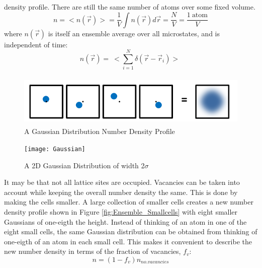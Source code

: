 \documentclass[double,12pt]{beavtex}
\begin{document}
density profile. There are still the same number of atoms over some fixed volume. 
\begin{equation}{n=<n(\vec{r})>=\frac{1}{V}\int{n(\vec{r})}{d\vec{r}}=\frac{N}{V}=\frac{1~\text{atom}}{V}}\end{equation}
where $n(\vec r)$ is itself an ensemble average over all microstates, and is independent of time:
\begin{equation}n(\vec r)=~<\sum_{i=1}^N\delta(\vec r - \vec r_i)>~\end{equation}

  \begin{figure}[h!]
    \centering
    \includegraphics[height=2.5cm]{Ensemble_Gaussian.png}
    \caption{A Gaussian Distribution Number Density Profile}
    \label{fig:Ensemble_Gaus}
  \end{figure} 

 \begin{figure}[h!]
    \centering
    \texttt{[image: Gaussian]}
    \caption{A 2D Gaussian Distribution of width 2$\sigma$}
    \label{fig:Gaus_plot}
  \end{figure}  

It may be that not all lattice sites are occupied. Vacancies can be taken 
into account while keeping %
the overall number density the same. This is done by 
making the cells smaller. A large collection of smaller cells creates a 
new number density profile shown in Figure \ref{fig:Ensemble_Smallcells} 
with eight smaller Gaussians of one-eigth the height. 
Instead of thinking of an atom in one of the eight small cells, the same 
Gaussian distribution can be obtained from thinking of one-eigth of an 
atom in each small cell. This makes it convenient to describe the new 
number density in terms of the fraction of vacancies, $f_v$: 
\begin{displaymath}{ n = (1-f_v){n_{no.vacancies}}}\end{displaymath} 
\end{document}

